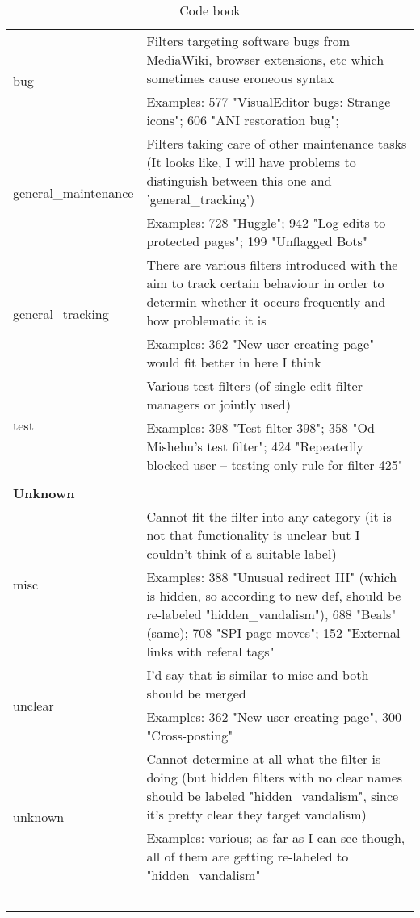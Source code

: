 \begin{longtable}{ | p{5cm} | p{9cm} | }
    \hline
    \multirow{2}{*}{bug} & Filters targeting software bugs from MediaWiki, browser extensions, etc which sometimes cause eroneous syntax\\
                                     & Examples: 577 "VisualEditor bugs: Strange icons"; 606 "ANI restoration bug";\\
    \hline
    \multirow{2}{*}{general\_maintenance} & Filters taking care of other maintenance tasks (It looks like, I will have problems to distinguish between this one and 'general\_tracking')\\
                                     & Examples: 728 "Huggle"; 942 "Log edits to protected pages"; 199 "Unflagged Bots"\\
    \hline
    \multirow{2}{*}{general\_tracking} & There are various filters introduced with the aim to track certain behaviour in order to determin whether it occurs frequently and how problematic it is\\
                                     & Examples: 362 "New user creating page" would fit better in here I think\\
    \hline
    \multirow{2}{*}{test} & Various test filters (of single edit filter managers or jointly used)\\
                                     & Examples: 398 "Test filter 398"; 358 "Od Mishehu's test filter"; 424 "Repeatedly blocked user --  testing-only rule for filter 425"\\
    \hline \hline
        \multicolumn{2}{|l|}{} \\
    \hline \hline
        \multicolumn{2}{|l|}{\textbf{Unknown}} \\
    \hline
    \multirow{2}{*}{misc} & Cannot fit the filter into any category (it is not that functionality is unclear but I couldn't think of a suitable label)\\
                                     & Examples: 388 "Unusual redirect III" (which is hidden, so according to new def, should be re-labeled "hidden\_vandalism"), 688 "Beals" (same); 708 "SPI page moves"; 152 "External links with referal tags"\\
    \hline
    \multirow{2}{*}{unclear} & I'd say that is similar to misc and both should be merged\\
                                     & Examples: 362 "New user creating page", 300 "Cross-posting"\\
    \hline
    \multirow{2}{*}{unknown} & Cannot determine at all what the filter is doing (but hidden filters with no clear names should be labeled "hidden\_vandalism", since it's pretty clear they target vandalism)\\
                                     & Examples: various; as far as I can see though, all of them are getting re-labeled to "hidden\_vandalism"\\
    \hline
    \caption{Code book}~\label{table:code-book}
\end{longtable}


